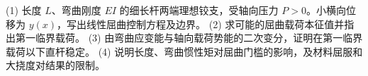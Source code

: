 (1) 长度 \(L\)、弯曲刚度 \(EI\) 的细长杆两端理想铰支，受轴向压力 \(P>0\)。小横向位移为 \(y(x)\)，写出线性屈曲控制方程及边界。
(2) 求可能的屈曲载荷本征值并指出第一临界载荷。
(3) 由弯曲应变能与轴向载荷势能的二次变分，证明在第一临界载荷以下直杆稳定。
(4) 说明长度、弯曲惯性矩对屈曲门槛的影响，及材料屈服和大挠度对结果的限制。
